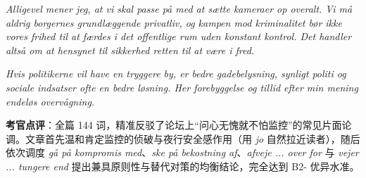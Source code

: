 \begin{answerbox}
\textit{Alligevel mener jeg, at vi skal passe på med at sætte kameraer op overalt. Vi må aldrig  borgernes grundlæggende privatliv, og kampen mod kriminalitet bør ikke  vores frihed til at færdes i det offentlige rum uden konstant kontrol. Det handler altså om at  hensynet til sikkerhed  retten til at være i fred.}

\textit{Hvis politikerne vil have en tryggere by, er bedre gadebelysning, synligt politi og sociale indsatser ofte en bedre løsning. Her  forebyggelse og tillid efter min mening  endeløs overvågning.}

\small\textbf{考官点评}：全篇 144 词，精准反驳了论坛上“问心无愧就不怕监控”的常见片面论调。文章首先温和肯定监控的侦破与夜行安全感作用（用 \textit{jo} 自然拉近读者），随后依次调度 \textit{gå på kompromis med}、\textit{ske på bekostning af}、\textit{afveje ... over for} 与 \textit{vejer ... tungere end} 提出兼具原则性与替代对策的均衡结论，完全达到 B2- 优异水准。
\end{answerbox}
